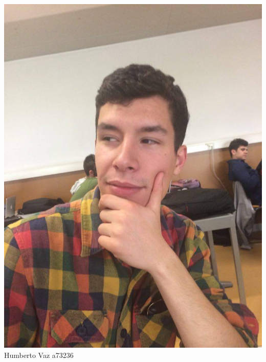 \begin{titlepage}
\begin{center}
\begin{minipage}[b]{.1\textwidth}
	\includegraphics[scale=0.1]{humberto}
	\small{Humberto Vaz a73236 }
\end{minipage} 
\hfill

\end{center}
\end{titlepage}
